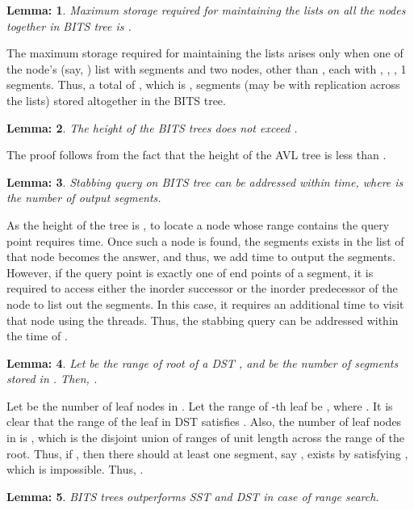 \documentclass{article}
\newtheorem{lemma}{Lemma:}
\newenvironment{proof}{{\bf Proof:}}{\hfill {\fbox{}}}
\begin{document}
\begin{lemma}
Maximum storage required for maintaining the lists on all the nodes together in BITS tree is .
\end{lemma}
\begin{proof}
The maximum storage required for maintaining the lists arises only when one of the node's (say, ) list with  segments and two nodes, other than , each with , , , 1 segments.
Thus, a total of , which is , segments (may be with replication across the lists) stored altogether in the BITS tree. 
\end{proof}
\begin{lemma}
The height of the BITS trees does not exceed .
\end{lemma}
\begin{proof}
The proof follows from the fact that the height of the AVL tree is less than  \cite{avl}.
\end{proof}
\begin{lemma}
Stabbing query on BITS tree can be addressed within  time, where  is the number of output segments.
\end{lemma}
\begin{proof}
As the height of the tree is , to locate a node whose range contains the query point requires  time. Once such a node is found, the segments exists in the list of that node becomes the answer, and thus, we add  time to output the segments. However, if the query point is exactly one of end points of a segment, it is required to access either the inorder successor or the inorder predecessor of the node to list out the segments. In this case, it requires an additional  time to visit that node using the threads. Thus, the stabbing query can be addressed within the time of .
\end{proof}
\begin{lemma}
Let  be the range of root of a DST , and  be the number of segments stored in . Then, .
\end{lemma}
\begin{proof}
Let  be the number of leaf nodes in . Let the range of -th leaf be , where  . It is clear that the range  of the leaf in DST satisfies . Also, the number of leaf nodes in  is , which is the disjoint union of ranges of unit length across the range of the root. Thus, if , then there should at least one segment, say , exists by satisfying , which is impossible. Thus, .
\end{proof}
\par
\begin{lemma}
BITS trees outperforms SST and DST in case of range search.
\end{lemma}
\end{document}
